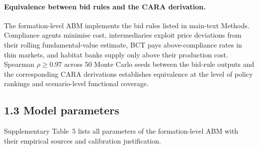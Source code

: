 \documentclass[pdflatex,sn-nature,oneside]{sn-jnl}
\begin{document}
\paragraph{Equivalence between bid rules and the CARA derivation.}
The formation-level ABM implements the bid rules listed in main-text
Methods. Compliance agents minimise cost, intermediaries exploit price
deviations from their rolling fundamental-value estimate, BCT pays
above-compliance rates in thin markets, and habitat banks supply only
above their production cost. Spearman $\rho \geq 0.97$ across 50 Monte
Carlo seeds between the bid-rule outputs and the corresponding CARA
derivations establishes equivalence at the level of policy rankings and
scenario-level functional coverage.


\subsection*{1.3 Model parameters}

Supplementary Table~5 lists all parameters of the formation-level ABM with their empirical sources and calibration justification.
\end{document}
